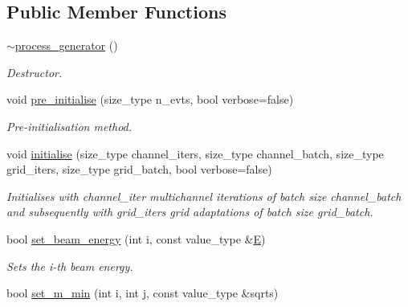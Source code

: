 \subsection*{Public Member Functions}
\begin{DoxyCompactItemize}
\item 
\hypertarget{a00436_ae7a869d2694c41b94244bbe0d065262f}{}\hyperlink{a00436_ae7a869d2694c41b94244bbe0d065262f}{$\sim$process\+\_\+generator} ()\label{a00436_ae7a869d2694c41b94244bbe0d065262f}

\begin{DoxyCompactList}\small\item\em Destructor. \end{DoxyCompactList}\item 
void \hyperlink{a00436_acba4decee3d33b680c02109f2df320f9}{pre\+\_\+initialise} (size\+\_\+type n\+\_\+evts, bool verbose=false)
\begin{DoxyCompactList}\small\item\em Pre-\/initialisation method. \end{DoxyCompactList}\item 
void \hyperlink{a00436_aff4d3947c4310438a4e8e6381f443cab}{initialise} (size\+\_\+type channel\+\_\+iters, size\+\_\+type channel\+\_\+batch, size\+\_\+type grid\+\_\+iters, size\+\_\+type grid\+\_\+batch, bool verbose=false)
\begin{DoxyCompactList}\small\item\em Initialises with channel\+\_\+iter multichannel iterations of batch size channel\+\_\+batch and subsequently with grid\+\_\+iters grid adaptations of batch size grid\+\_\+batch. \end{DoxyCompactList}\item 
\hypertarget{a00436_ae033e78f0e905e357bfae4a735ca79b1}{}bool \hyperlink{a00436_ae033e78f0e905e357bfae4a735ca79b1}{set\+\_\+beam\+\_\+energy} (int i, const value\+\_\+type \&\hyperlink{a00451_a8a2e0cd9b961dcfa2eb1ac7426cf3f5f}{E})\label{a00436_ae033e78f0e905e357bfae4a735ca79b1}

\begin{DoxyCompactList}\small\item\em Sets the i-\/th beam energy. \end{DoxyCompactList}\item 
\hypertarget{a00436_a055a05d4ac50c5c220ada4d04ce41710}{}bool \hyperlink{a00436_a055a05d4ac50c5c220ada4d04ce41710}{set\+\_\+m\+\_\+min} (int i, int j, const value\+\_\+type \&sqrts)\label{a00436_a055a05d4ac50c5c220ada4d04ce41710}


\end{DoxyCompactItemize}
